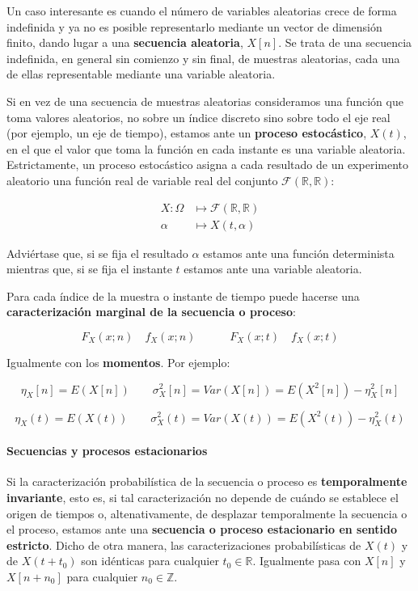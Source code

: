\documentclass[11pt]{article}
\begin{document}
Un caso interesante es cuando el número de variables aleatorias crece de
forma indefinida y ya no es posible representarlo mediante un vector de
dimensión finito, dando lugar a una \textbf{secuencia aleatoria},
\(X[n]\). Se trata de una secuencia indefinida, en general sin comienzo
y sin final, de muestras aleatorias, cada una de ellas representable
mediante una variable aleatoria.

Si en vez de una secuencia de muestras aleatorias consideramos una
función que toma valores aleatorios, no sobre un índice discreto sino
sobre todo el eje real (por ejemplo, un eje de tiempo), estamos ante un
\textbf{proceso estocástico}, \(X(t)\), en el que el valor que toma la
función en cada instante es una variable aleatoria. Estrictamente, un
proceso estocástico asigna a cada resultado de un experimento aleatorio
una función real de variable real del conjunto
\(\mathcal{F}(\mathbb{R}, \mathbb{R})\):

\begin{align*}
X:  \mathscr{\Omega} & \longmapsto \mathcal{F}(\mathbb{R}, \mathbb{R})\\
   \alpha & \longmapsto X(t, \alpha)
   \end{align*}
 

Adviértase que, si se fija el resultado \(\alpha\) estamos ante una
función determinista mientras que, si se fija el instante \(t\) estamos
ante una variable aleatoria.

    Para cada índice de la muestra o instante de tiempo puede hacerse una
\textbf{caracterización marginal de la secuencia o proceso}:

\[F_X(x; n) \quad f_X(x; n) \quad\qquad F_X(x; t) \quad f_X(x; t)\]

Igualmente con los \textbf{momentos}. Por ejemplo:

\[\eta_X[n] = E(X[n]) \qquad \sigma_X^2[n]=Var(X[n]) = E(X^2[n]) - \eta_X^2[n]\]

\[\eta_X(t) = E(X(t)) \qquad \sigma_X^2(t)=Var(X(t)) = E(X^2(t)) - \eta_X^2(t)\]

    \hypertarget{secuencias-y-procesos-estacionarios}{%
\paragraph{Secuencias y procesos
estacionarios}\label{secuencias-y-procesos-estacionarios}}

Si la caracterización probabilística de la secuencia o proceso es
\textbf{temporalmente invariante}, esto es, si tal caracterización no
depende de cuándo se establece el origen de tiempos o, altenativamente,
de desplazar temporalmente la secuencia o el proceso, estamos ante una
\textbf{secuencia o proceso estacionario en sentido estricto}. Dicho de
otra manera, las caracterizaciones probabilísticas de \(X(t)\) y de
\(X(t+t_0)\) son idénticas para cualquier \(t_0 \in \mathbb{R}\).
Igualmente pasa con \(X[n]\) y \(X[n+n_0]\) para cualquier
\(n_0 \in \mathbb{Z}\).
\end{document}
